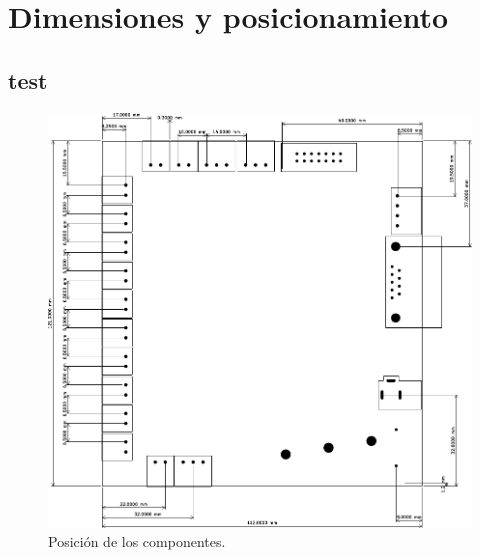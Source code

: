 \documentclass{reporti}
\begin{document}
\cover[width=1.35\textwidth]
\tableofcontents
\listoffigures
\listoftables

\section{Dimensiones y posicionamiento}
\subsection{test}
\begin{figure}[h]
  \centering
  \includegraphics[scale=1]{PCB_dimensiones.pdf}
  \caption{Posición de los componentes.}
\end{figure}
\end{document}
